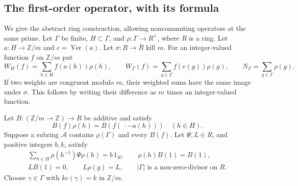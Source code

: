 \documentclass[11pt,a4paper]{article}
\theoremstyle{definition}
\newcommand{\Z}{\mathbb Z}
\begin{document}
\subsection{The first-order operator, with its formula}
We give the abstract ring construction, allowing
noncommuting operators at the same prime.
Let \(\Gamma\) be finite, \(H\subset\Gamma\), and
\(\rho:\Gamma\to R^\times\), where \(R\) is a ring.
Let \(a:H\to\Z/m\) and \(c=\operatorname{Ver}(a)\).
Let \(\sigma:R\to\bar R\) kill \(m\).
For an integer-valued function \(f\) on \(\Z/m\) put
\[
 W_H(f)=\sum_{h\in H}f(a(h))\rho(h),\qquad
 W_\Gamma(f)=\sum_{g\in\Gamma}f(c(g))\rho(g),\qquad
 N_\Gamma=\sum_{g\in\Gamma}\rho(g).
\]
If two weights are congruent modulo \(m\), their
weighted sums have the same image under \(\sigma\).
This follows by writing their difference as
\(m\) times an integer-valued function.

Let \(B:(\Z/m\to\Z)\to R\) be additive and satisfy
\[
 B(f)\rho(h)=B(f(\,\cdot-a(h)))\quad(h\in H).
\]
Suppose a subring \(\mathcal A\) contains
\(\rho(\Gamma)\) and every \(B(f)\).
Let \(\Psi,L\in R\), and positive integers \(b,k\),
satisfy
\begin{equation}\label{eq:one-prime-hyp}
 \begin{gathered}
 \sum_{h\in H}\rho(h^{-1})\Psi\rho(h)=b\,1_R,\qquad
 \rho(h)B(1)=B(1),\\
 LB(1)=0,\qquad L\rho(g)=L,\qquad
 |\Gamma|\text{ is a non-zero-divisor on }R .
 \end{gathered}
\end{equation}
Choose \(\gamma\in\Gamma\) with \(k c(\gamma)=k\)
in \(\Z/m\).
\end{document}
